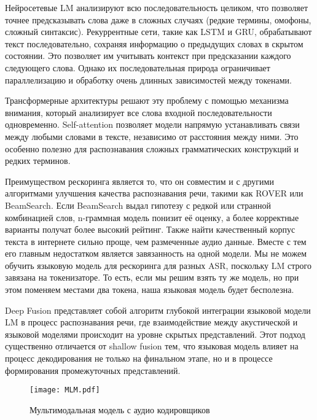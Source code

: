 Нейросетевые LM анализируют всю последовательность целиком, что позволяет точнее предсказывать слова даже в сложных случаях (редкие термины, омофоны, сложный синтаксис).
Рекуррентные сети, такие как LSTM и GRU, обрабатывают текст последовательно, сохраняя информацию о предыдущих словах в скрытом состоянии.
Это позволяет им учитывать контекст при предсказании каждого следующего слова.
Однако их последовательная природа ограничивает параллелизацию и обработку очень длинных зависимостей между токенами.

Трансформерные архитектуры решают эту проблему с помощью механизма внимания, который анализирует все слова входной последовательности одновременно.
Self-attention позволяет модели напрямую устанавливать связи между любыми словами в тексте, независимо от расстояния между ними.
Это особенно полезно для распознавания сложных грамматических конструкций и редких терминов.

Преимуществом рескоринга является то, что он совместим и с другими алгоритмами улучшения качества распознавания речи, такими как ROVER или BeamSearch.
Если BeamSearch выдал гипотезу с редкой или странной комбинацией слов, n-граммная модель понизит её оценку, а более корректные варианты получат более высокий рейтинг.
Также найти качественный корпус текста в интернете сильно проще, чем размеченные аудио данные.
Вместе с тем его главным недостатком является завязанность на одной модели.
Мы не можем обучить языковую модель для рескоринга для разных ASR, поскольку LM строго завязана на токенизаторе.
То есть, если мы решим взять ту же модель, но при этом поменяем местами два токена, наша языковая модель будет бесполезна.

Deep Fusion представляет собой алгоритм глубокой интеграции языковой модели LM в процесс распознавания речи, где взаимодействие между акустической и языковой моделями происходит на уровне скрытых представлений.
Этот подход существенно отличается от shallow fusion тем, что языковая модель влияет на процесс декодирования не только на финальном этапе, но и в процессе формирования промежуточных представлений.

\begin{figure}[!t]
  \centering
  \texttt{[image: MLM.pdf]}
  \caption{Мультимодальная модель с аудио кодировщиков}
  \label{fig:mlm}
\end{figure}

